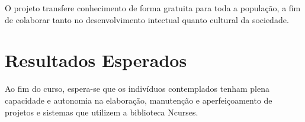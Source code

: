 \documentclass[a4paper,10pt]{article} %
\begin{document}
O projeto transfere conhecimento de forma gratuita para toda a população, a fim de colaborar tanto no desenvolvimento intectual quanto cultural da sociedade.

\section{Resultados Esperados}
Ao fim do curso, espera-se que os indivíduos contemplados tenham plena capacidade e autonomia na elaboração, manutenção e aperfeiçoamento de projetos e sistemas que utilizem a biblioteca Ncurses.


\nocite{*}


%



\end{document}
